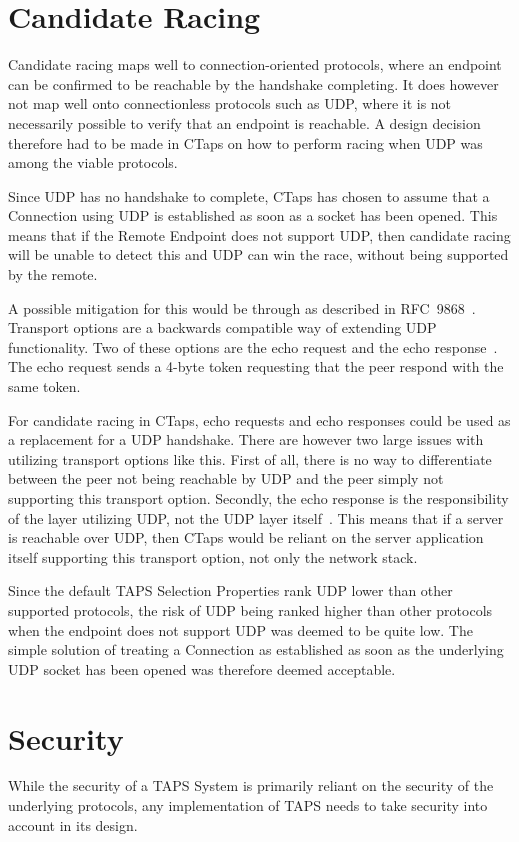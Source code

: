 
\section{Candidate Racing}
Candidate racing maps well to connection-oriented
protocols, where an endpoint can be confirmed to be reachable
by the handshake completing. It does however not map
well onto connectionless protocols such as UDP, where
it is not necessarily possible to verify that an endpoint is reachable.
A design decision therefore had to be made in CTaps on how to perform
racing when UDP was among the viable protocols.

Since UDP has no handshake to complete, CTaps has chosen to assume that a Connection
using UDP is established as soon as a socket has been opened. This means that
if the Remote Endpoint does not support UDP, then candidate racing will be unable to detect
this and UDP can win the race, without being supported by the remote.

A possible mitigation for this would be through 
as described in RFC~9868~\cite{rfc9868}.
Transport options are a backwards compatible way of extending UDP functionality.
Two of these options are the echo request
and the echo response~\cite[sec.~11.7]{rfc9868}.
The echo request sends a 4-byte token requesting that the peer
respond with the same token.

For candidate racing in CTaps, echo requests and echo
responses could be used as a replacement for a UDP handshake. There are however two
large issues with utilizing transport options like this.
First of all, there is no way to differentiate between the peer not being reachable
by UDP and the peer simply not supporting this transport option.
Secondly, the echo response is the responsibility of the layer
utilizing UDP, not the UDP layer itself~\cite[sec.~11.7]{rfc9868}. This means that if a server
is reachable over UDP, then CTaps would be reliant on the server application
itself supporting this transport option, not only the network stack.

Since the default TAPS Selection Properties rank UDP lower than other supported protocols,
the risk of UDP being ranked higher than other protocols when
the endpoint does not support UDP was deemed to be quite low. The simple solution
of treating a Connection as established as soon as the underlying UDP socket has
been opened was therefore deemed acceptable.

\section{Security}\label{sec:design-sec}
While the security of a TAPS System is primarily reliant on the security of the underlying protocols,
any implementation of TAPS needs to take security into account in its design.

